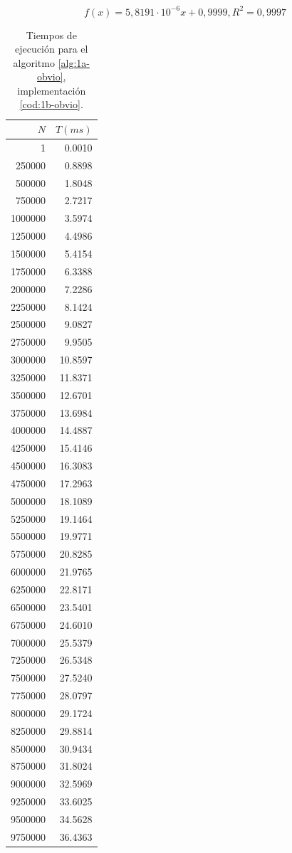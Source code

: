 \begin{equation}
    \boxed{f(x) = 5,8191 \cdot 10 ^{-6} x + 0,9999, R^2 = 0,9997}
    \label{eq:1b-obvio-regresion}
\end{equation}

\begin{table}
	\footnotesize
	\centering
	\begin{tabular}{|r|r|}
        \hline
        $N$ & $T (ms)$ \\
        \hline
		1 & 0.0010 \\ 
		250000 & 0.8898 \\ 
		500000 & 1.8048 \\ 
		750000 & 2.7217 \\ 
		1000000 & 3.5974 \\ 
		1250000 & 4.4986 \\ 
		1500000 & 5.4154 \\ 
		1750000 & 6.3388 \\ 
		2000000 & 7.2286 \\ 
		2250000 & 8.1424 \\ 
		2500000 & 9.0827 \\ 
		2750000 & 9.9505 \\ 
		3000000 & 10.8597 \\ 
		3250000 & 11.8371 \\ 
		3500000 & 12.6701 \\ 
		3750000 & 13.6984 \\ 
		4000000 & 14.4887 \\ 
		4250000 & 15.4146 \\ 
		4500000 & 16.3083 \\ 
		4750000 & 17.2963 \\ 
		5000000 & 18.1089 \\ 
		5250000 & 19.1464 \\ 
		5500000 & 19.9771 \\ 
		5750000 & 20.8285 \\ 
		6000000 & 21.9765 \\ 
		6250000 & 22.8171 \\ 
		6500000 & 23.5401 \\ 
		6750000 & 24.6010 \\ 
		7000000 & 25.5379 \\ 
		7250000 & 26.5348 \\ 
		7500000 & 27.5240 \\ 
		7750000 & 28.0797 \\ 
		8000000 & 29.1724 \\ 
		8250000 & 29.8814 \\ 
		8500000 & 30.9434 \\ 
		8750000 & 31.8024 \\ 
		9000000 & 32.5969 \\ 
		9250000 & 33.6025 \\ 
		9500000 & 34.5628 \\ 
		9750000 & 36.4363 \\ 
        \hline
	\end{tabular}

    \caption{Tiempos de ejecución para el algoritmo \ref{alg:1a-obvio}, implementación \ref{cod:1b-obvio}.}
    \label{tab:1b-obvio}
\end{table}

